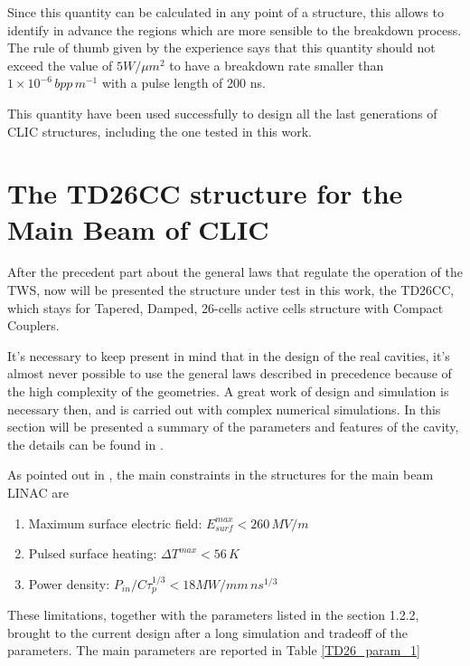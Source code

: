 Since this quantity can be calculated in any point of a structure, this allows to identify in advance the regions which are more sensible to the breakdown process. The rule of thumb given by the experience says that this quantity should not exceed the value of $5 W/\mu m^2$ to have a breakdown rate smaller than $1\times 10^{-6} \, bpp \, m^{-1}$ with a pulse length of 200 ns.

This quantity have been used successfully to design all the last generations of CLIC structures, including the one tested in this work.






\section[The TD26CC structure for the Main Beam of CLIC]{The TD26CC structure for the Main Beam of CLIC}

After the precedent part about the general laws that regulate the operation of the TWS, now will be presented the structure under test in this work, the TD26CC, which stays for Tapered, Damped, 26-cells active cells structure with Compact Couplers.

It's necessary to keep present in mind that in the design of the real cavities, it's almost never possible to use the general laws described in precedence because of the high complexity of the geometries. A great work of design and simulation is necessary then, and is carried out with complex numerical simulations. In this section will be presented a summary of the parameters and features of the cavity, the details can be found in \cite{CLIC:cdr,Grudiev:td26cc,Lunin:1333709}.

As pointed out in \cite{CLIC:cdr}, the main constraints in the structures for the main beam LINAC are 
\begin{enumerate}
\item Maximum surface electric field: $E_{surf}^{max} < 260 \, MV/m$
\item Pulsed surface heating: $\Delta T^{max} < 56 \,K$
\item Power density: $P_{in}/C\tau_p^{1/3} < 18 MW/mm \, ns^{1/3}$
\end{enumerate}

These limitations, together with the parameters listed in the section 1.2.2, brought to the current design after a long simulation and tradeoff of the parameters. The main parameters are reported in Table \ref{TD26_param_1}

